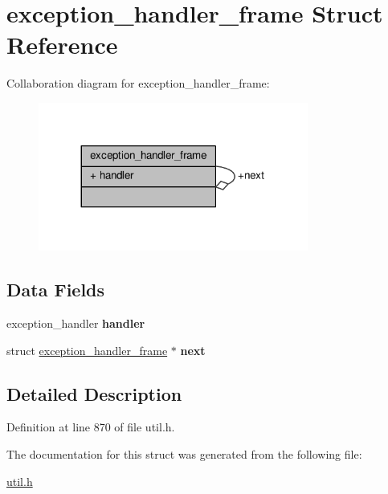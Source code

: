\hypertarget{structexception__handler__frame}{}\section{exception\+\_\+handler\+\_\+frame Struct Reference}
\label{structexception__handler__frame}


Collaboration diagram for exception\+\_\+handler\+\_\+frame\+:\nopagebreak
\begin{figure}[H]
\begin{center}
\leavevmode
\includegraphics[width=251pt]{structexception__handler__frame__coll__graph}
\end{center}
\end{figure}
\subsection*{Data Fields}
\begin{DoxyCompactItemize}
\item 
exception\+\_\+handler {\bfseries handler}\hypertarget{structexception__handler__frame_a9df815cc8cec8aace242043b89fb44e8}{}\label{structexception__handler__frame_a9df815cc8cec8aace242043b89fb44e8}

\item 
struct \hyperlink{structexception__handler__frame}{exception\+\_\+handler\+\_\+frame} $\ast$ {\bfseries next}\hypertarget{structexception__handler__frame_a407cf31d00d01b49b1774dea464c29cf}{}\label{structexception__handler__frame_a407cf31d00d01b49b1774dea464c29cf}

\end{DoxyCompactItemize}


\subsection{Detailed Description}


Definition at line 870 of file util.\+h.



The documentation for this struct was generated from the following file\+:\begin{DoxyCompactItemize}
\item 
\hyperlink{util_8h}{util.\+h}\end{DoxyCompactItemize}

